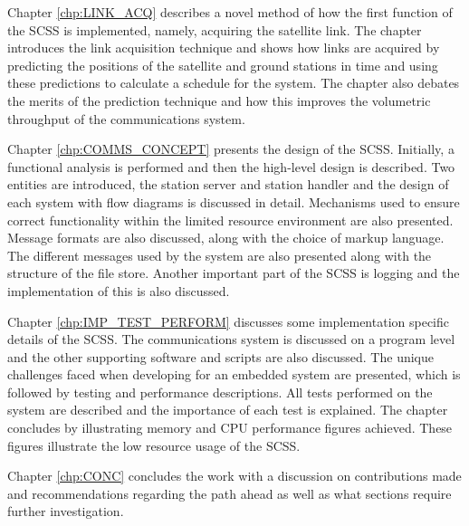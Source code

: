 Chapter \ref{chp:LINK_ACQ} describes a novel method of how the first function of the SCSS
is implemented, namely, acquiring the satellite link. The chapter introduces the link acquisition technique
and shows how links are acquired by predicting the positions of the satellite and ground stations in time and
using these predictions to calculate a schedule for the system. The chapter also debates the merits
of the prediction technique and how this improves the volumetric throughput of the communications
system.

Chapter \ref{chp:COMMS_CONCEPT} presents the design of the SCSS. Initially, a functional
analysis is performed and then the high-level design is described. Two entities are introduced, the station
server and station handler and the design of each system with flow diagrams is discussed in detail.
Mechanisms used to ensure correct functionality within the limited resource environment are also presented.
Message formats are also discussed, along with the choice of markup language. The different messages
used by the system are also presented along with the structure of the file store. Another important part
of the SCSS is logging and the implementation of this is also discussed.

Chapter \ref{chp:IMP_TEST_PERFORM} discusses some implementation specific details of the SCSS.
The communications system is discussed on a program level and the other supporting software and
scripts are also discussed. The unique challenges faced when developing for an embedded system are
presented, which is followed by testing and performance descriptions. All tests performed on the system are
described and the importance of each test is explained. The chapter concludes by illustrating
memory and CPU performance figures achieved. These figures illustrate the low resource
usage of the SCSS.

Chapter \ref{chp:CONC} concludes the work with a discussion on contributions made and recommendations
regarding the path ahead as well as what sections require further investigation.



